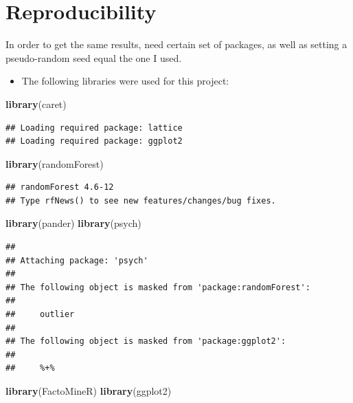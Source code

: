 \documentclass[]{article}
\newenvironment{Shaded}{\begin{snugshade}}{\end{snugshade}}
\newcommand{\KeywordTok}[1]{\textcolor[rgb]{0.13,0.29,0.53}{\textbf{{#1}}}}
\newcommand{\NormalTok}[1]{{#1}}
\begin{document}
\section{Reproducibility}\label{reproducibility}

In order to get the same results, need certain set of packages, as well
as setting a pseudo-random seed equal the one I used.

\begin{itemize}
\itemsep1pt\parskip0pt
\item
  The following libraries were used for this project:
\end{itemize}

\begin{Shaded}
\begin{Highlighting}[]
\KeywordTok{library}\NormalTok{(caret)}
\end{Highlighting}
\end{Shaded}

\begin{verbatim}
## Loading required package: lattice
## Loading required package: ggplot2
\end{verbatim}

\begin{Shaded}
\begin{Highlighting}[]
\KeywordTok{library}\NormalTok{(randomForest)}
\end{Highlighting}
\end{Shaded}

\begin{verbatim}
## randomForest 4.6-12
## Type rfNews() to see new features/changes/bug fixes.
\end{verbatim}

\begin{Shaded}
\begin{Highlighting}[]
\KeywordTok{library}\NormalTok{(pander)}
\KeywordTok{library}\NormalTok{(psych)}
\end{Highlighting}
\end{Shaded}

\begin{verbatim}
## 
## Attaching package: 'psych'
## 
## The following object is masked from 'package:randomForest':
## 
##     outlier
## 
## The following object is masked from 'package:ggplot2':
## 
##     %+%
\end{verbatim}

\begin{Shaded}
\begin{Highlighting}[]
\KeywordTok{library}\NormalTok{(FactoMineR)}
\KeywordTok{library}\NormalTok{(ggplot2)}
\end{Highlighting}
\end{Shaded}
\end{document}
